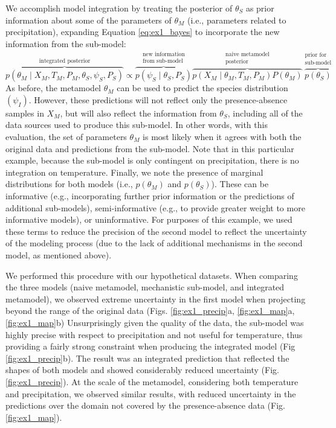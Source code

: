 \documentclass[11pt]{article}
\begin{document}
We accomplish model integration by treating the posterior of \(\theta_S\) as prior information about some of the parameters of \(\theta_M\) (i.e., parameters related to precipitation), expanding Equation \ref{eq:ex1_bayes} to incorporate the new information from the sub-model:
\begin{equation}
	\label{eq:ex1_integrated}
	\overbrace{p(\theta_M \mid X_M, T_M, P_M, \theta_S, \psi_S, P_S)}^\text{integrated posterior}
	\propto
	\overbrace{p\left (\psi_S \mid \theta_S,P_S \right )}^{\substack{\text{new information} \\ \text{from sub-model}}}
	\overbrace{p \left(X_M \mid \theta_M, T_M, P_M \right) P \left(\theta_M \right)}^{\substack{\text{naive metamodel} \\ \text{posterior}}}
	\overbrace{p \left(\theta_S \right)}^{\substack{\text{prior for} \\ \text{sub-model}}}	
\end{equation}
As before, the metamodel \(\theta_M\) can be used to predict the species distribution \((\psi_I)\).
However, these predictions will not reflect only the presence-absence samples in \(X_M\), but will also reflect the information from \(\theta_S\), including all of the data sources used to produce this sub-model.
In other words, with this evaluation, the set of parameters $\theta_M$ is most likely when it agrees with both the original data and predictions from the sub-model. 
Note that in this particular example, because the sub-model is only contingent on precipitation, there is no integration on temperature. 
Finally, we note the presence of marginal distributions for both models (i.e., \(p(\theta_M)\) and \(p(\theta_S)\)).
These can be informative (e.g., incorporating further prior information or the predictions of additional sub-models), semi-informative (e.g., to provide greater weight to more informative models), or uninformative.
For purposes of this example, we used these terms to reduce the precision of the second model to reflect the uncertainty of the modeling process (due to the lack of additional mechanisms in the second model, as mentioned above).

We performed this procedure with our hypothetical datasets.
When comparing the three models (naive metamodel, mechanistic sub-model, and integrated metamodel), we observed extreme uncertainty in the first model when projecting beyond the range of the original data (Figs. \ref{fig:ex1_precip}a, \ref{fig:ex1_map}a, \ref{fig:ex1_map}b)
Unsurprisingly given the quality of the data, the sub-model was highly precise with respect to precipitation and not useful for temperature, thus providing a fairly strong constraint when producing the integrated model (Fig \ref{fig:ex1_precip}b).
The result was an integrated prediction that reflected the shapes of both models and showed considerably reduced uncertainty (Fig. \ref{fig:ex1_precip}).
At the scale of the metamodel, considering both temperature and precipitation, we observed similar results, with reduced uncertainty in the predictions over the domain not covered by the presence-absence data (Fig. \ref{fig:ex1_map}).
\end{document}
